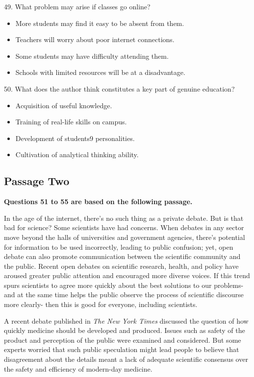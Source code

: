 \documentclass[UTF8,11pt]{ctexart}
\begin{document}
49. What problem may arise if classes go online?


\begin{itemize}[leftmargin=2em,itemsep=.2em,topsep=.4em]\item[A.] More students may find it easy to be absent from them.
\item[B.] Teachers will worry about poor internet connections.
\item[C.] Some students may have difficulty attending them.
\item[D.] Schools with limited resources will be at a disadvantage.
\end{itemize}

50. What does the author think constitutes a key part of genuine education?


\begin{itemize}[leftmargin=2em,itemsep=.2em,topsep=.4em]\item[A.] Acquisition of useful knowledge.
\item[B.] Training of real-life skills on campus.
\item[C.] Development of students9 personalities.
\item[D.] Cultivation of analytical thinking ability.
\end{itemize}

\subsection*{\textbf{Passage Two}}


\textbf{Questions 51 to 55 are based on the following passage.}


In the age of the internet, there's no such thing as a private debate. But is that bad for science? Some scientists have had concerns. When debates in any sector move beyond the halls of universities and government agencies, there's potential for information to be used incorrectly, leading to public confusion; yet, open debate can also promote communication between the scientific community and the public. Recent open debates on scientific research, health, and policy have aroused greater public attention and encouraged more diverse voices. If this trend spurs scientists to agree more quickly about the best solutions to our problems-and at the same time helps the public observe the process of scientific discourse more clearly- then this is good for everyone, including scientists.


A recent debate published in \textit{The New York Times} discussed the question of how quickly medicine should be developed and produced. Issues such as safety of the product and perception of the public were examined and considered. But some experts worried that such public speculation might lead people to believe that disagreement about the details meant a lack of adequate scientific consensus over the safety and efficiency of modern-day medicine.
\end{document}

